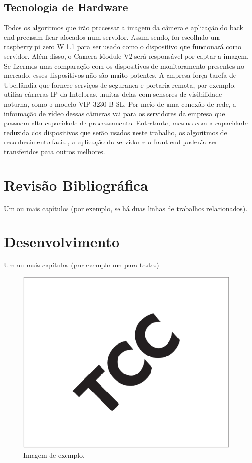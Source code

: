 \documentclass[12pt, %
openright, 
oneside, %
a4paper,    %
brazil]{facom-ufu-abntex2}
\begin{document}
\section{Tecnologia de Hardware}

Todos os algoritmos que irão processar a imagem da câmera e aplicação do back
end precisam ficar alocados num servidor. Assim sendo, foi escolhido um
raspberry pi zero W 1.1 para ser usado como o dispositivo que funcionará como
servidor. Além disso, o Camera Module V2 será responsável por captar a imagem.
Se fizermos uma comparação com os dispositivos de monitoramento presentes no
mercado, esses dispositivos não são muito potentes. A empresa força tarefa de
Uberlândia que fornece serviços de segurança e portaria remota, por exemplo,
utiliza câmeras IP da Intelbras, muitas delas com sensores de visibilidade
noturna, como o modelo VIP 3230 B SL. Por meio de uma conexão de rede, a
informação de vídeo dessas câmeras vai para os servidores da empresa que
possuem alta capacidade de processamento. Entretanto, mesmo com a capacidade
reduzida dos dispositivos que serão usados neste trabalho, os algoritmos de
reconhecimento facial, a aplicação do servidor e o front end poderão ser
transferidos para outros melhores.


\chapter{Revisão Bibliográfica}
Um ou mais capítulos (por exemplo, se há duas linhas de trabalhos
relacionados).

\chapter{Desenvolvimento}
Um ou mais capítulos (por exemplo um para testes)

\begin{figure}[!ht]
	\centering
	\includegraphics[width=0.55\linewidth]{imagemExemplo.pdf}
	\caption[Isso é o que aparece no sumário]{Imagem de exemplo.}
	\label{fig:graficosVariandoTamanhoRede}
\end{figure}
\end{document}
